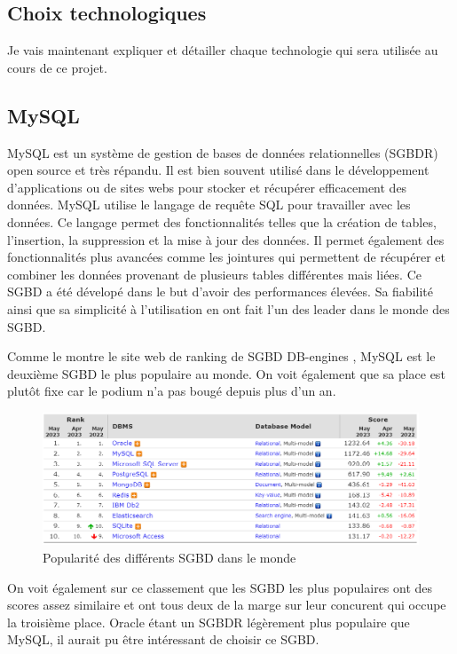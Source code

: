 \subsection{Choix technologiques}
Je vais maintenant expliquer et détailler chaque technologie qui sera utilisée au cours de ce projet.

\subsection{MySQL}
MySQL est un système de gestion de bases de données relationnelles (SGBDR) open source et très répandu. Il est bien souvent utilisé dans le développement d'applications ou de sites webs pour stocker et récupérer efficacement des données. MySQL utilise le langage de requête SQL pour travailler avec les données. Ce langage permet des fonctionnalités telles que la création de tables, l'insertion, la suppression et la mise à jour des données. Il permet également des fonctionnalités plus avancées comme les jointures qui permettent de récupérer et combiner les données provenant de plusieurs tables différentes mais liées. Ce SGBD a été dévelopé dans le but d'avoir des performances élevées. Sa fiabilité ainsi que sa simplicité à l'utilisation en ont fait l'un des leader dans le monde des SGBD.

Comme le montre le site web de ranking de SGBD DB-engines \cite{DBengines}, MySQL est le deuxième SGBD le plus populaire au monde. On voit également que sa place est plutôt fixe car le podium n'a pas bougé depuis plus d'un an.
\begin{center} %
  \begin{figure}[H]
    \includegraphics[width=14cm]{./assets/figures/MySQLPopularity.png}
    \caption{Popularité des différents SGBD dans le monde \label{MySQLPopularity.png}}
  \end{figure}
\end{center}
On voit également sur ce classement que les SGBD les plus populaires ont des scores assez similaire et ont tous deux de la marge sur leur concurent qui occupe la troisième place. Oracle étant un SGBDR légèrement plus populaire que MySQL, il aurait pu être intéressant de choisir ce SGBD.

